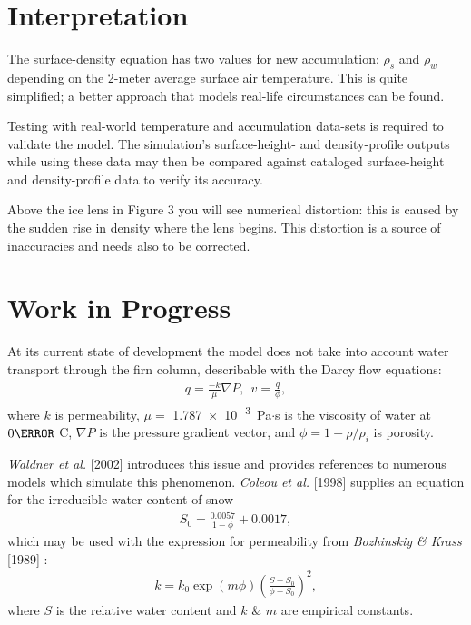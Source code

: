 \documentclass{article}%
\begin{document}
\section{Interpretation}

The surface-density equation has two values for new accumulation: $\rho_s$ and $\rho_w$ depending on the 2-meter average surface air temperature.  This is quite simplified; a better approach that models real-life circumstances can be found.  

Testing with real-world temperature and accumulation data-sets is required to validate the model.  The simulation's surface-height- and density-profile outputs while using these data may then be compared against cataloged surface-height and density-profile data to verify its accuracy.

Above the ice lens in Figure 3 you will see numerical distortion: this is caused by the sudden rise in density where the lens begins.  This distortion is a source of inaccuracies and needs also to be corrected.

\section{Work in Progress}
At its current state of development the model does not take into account water transport through the firn column, describable with the Darcy flow equations:
\begin{align*}
    q = \frac{-k}{\mu}\nabla P, \ \  v = \frac{q}{\phi},
\end{align*}
where $k$ is permeability, $\mu =$ \SI{1.787e-3} Pa$\cdot$s is the viscosity of water at $0\degree$ C, $\nabla P$ is the pressure gradient vector, and $\phi = 1- \rho/\rho_i$ is porosity.

\emph{Waldner et al.} [2002] introduces this issue and provides references to numerous models which simulate this phenomenon.  \emph{Coleou et al.} [1998] supplies an equation for the irreducible water content of snow
\begin{align*}
    S_0 = \frac{0.0057}{1 - \phi} + 0.0017,
\end{align*}
which may be used with the expression for permeability from \emph{Bozhinskiy \& Krass} [1989] :
\begin{align*}
    k = k_0 \exp(m \phi)\left( \frac{S - S_0}{\phi - S_0} \right)^2,
\end{align*}
where $S$ is the relative water content and $k$ \& $m$ are empirical constants.
\end{document}
